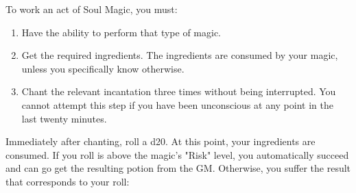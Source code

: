 \documentclass[green]{Kos}
\begin{document}
\name{\gWardSoulMagic{}}


To work an act of Soul Magic, you must:

\begin{enumerate} 
\item Have the ability to perform that type of magic.
\item Get the required ingredients. The ingredients are consumed by your magic, unless you specifically know otherwise.
\item Chant the relevant incantation three times without being interrupted. You cannot attempt this step if you have been unconscious at any point in the last twenty minutes.
\end{enumerate}

Immediately after chanting, roll a d20. At this point, your ingredients are consumed. If you roll is above the magic's "Risk" level, you automatically succeed and can go get the resulting potion from the GM. Otherwise, you suffer the result that corresponds to your roll:
\end{document}

